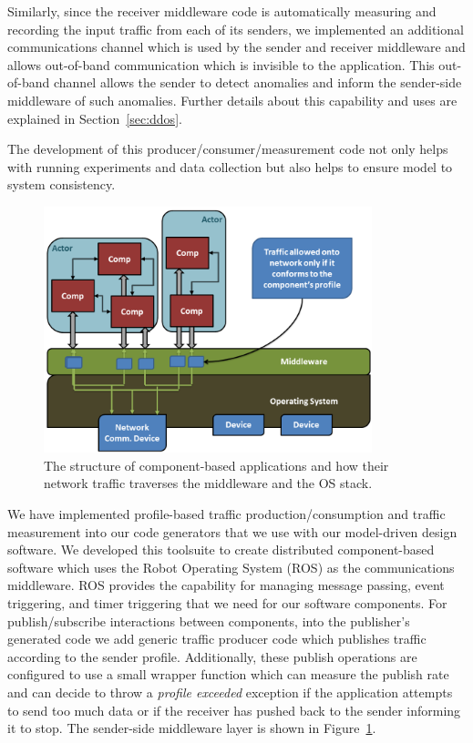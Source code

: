 Similarly, since the receiver middleware code is automatically
measuring and recording the input traffic from each of its senders, we
implemented an additional communications channel which is used by the
sender and receiver middleware and allows out-of-band communication
which is invisible to the application.  This out-of-band channel
allows the sender to detect anomalies and inform the sender-side
middleware of such anomalies.  Further details about this capability
and uses are explained in Section~\ref{sec:ddos}.

The development of this producer/consumer/measurement code not only
helps with running experiments and data collection but also helps to
ensure model to system consistency.
  
\begin{figure}[ht!]
  \centering
  \includegraphics[width=0.85\textwidth]{../doc/src/images/results/app_layers.png}
  \caption{The structure of component-based applications and how their network
   traffic traverses the middleware and the OS stack.}
  \label{fig:sender}
\end{figure}

We have implemented profile-based traffic production/consumption and
traffic measurement into our code generators that we use with our
model-driven design software.  We developed this toolsuite to create
distributed component-based software which uses the Robot Operating
System (ROS)\cite{ros} as the communications middleware.  ROS provides
the capability for managing message passing, event triggering, and
timer triggering that we need for our software components.  For
publish/subscribe interactions between components, into the
publisher's generated code we add generic traffic producer code which
publishes traffic according to the sender profile.  Additionally,
these publish operations are configured to use a small wrapper
function which can measure the publish rate and can decide to throw a
\emph{profile exceeded} exception if the application attempts to send
too much data or if the receiver has pushed back to the sender
informing it to stop.  The sender-side middleware layer is shown in
Figure~\ref{fig:sender}.

